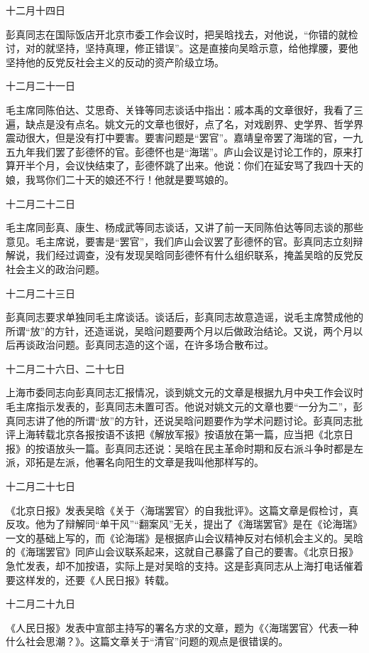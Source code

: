 \begin{maonote}
十二月十四日

彭真同志在国际饭店开北京市委工作会议时，把吴晗找去，对他说，“你错的就检讨，对的就坚持，坚持真理，修正错误”。这是直接向吴晗示意，给他撑腰，要他坚持他的反党反社会主义的反动的资产阶级立场。

十二月二十一日

毛主席同陈伯达、艾思奇、关锋等同志谈话中指出：戚本禹的文章很好，我看了三遍，缺点是没有点名。姚文元的文章也很好，点了名，对戏剧界、史学界、哲学界震动很大，但是没有打中要害。要害问题是“罢官”。嘉靖皇帝罢了海瑞的官，一九五九年我们罢了彭德怀的官。彭德怀也是“海瑞”。庐山会议是讨论工作的，原来打算开半个月，会议快结束了，彭德怀跳了出来。他说：你们在延安骂了我四十天的娘，我骂你们二十天的娘还不行！他就是要骂娘的。

十二月二十二日

毛主席同彭真、康生、杨成武等同志谈话，又讲了前一天同陈伯达等同志谈的那些意见。毛主席说，要害是“罢官”，我们庐山会议罢了彭德怀的官。彭真同志立刻辩解说，我们经过调查，没有发现吴晗同彭德怀有什么组织联系，掩盖吴晗的反党反社会主义的政治问题。

十二月二十三日

彭真同志要求单独同毛主席谈话。谈话后，彭真同志故意造谣，说毛主席赞成他的所谓“放”的方针，还造谣说，吴晗问题要两个月以后做政治结论。又说，两个月以后再谈政治问题。彭真同志造的这个谣，在许多场合散布过。

十二月二十六日、二十七日

上海市委同志向彭真同志汇报情况，谈到姚文元的文章是根据九月中央工作会议时毛主席指示发表的，彭真同志未置可否。他说对姚文元的文章也要“一分为二”，彭真同志讲了他的所谓“放”的方针，还说吴晗问题要作为学术问题讨论。彭真同志批评上海转载北京各报按语不该把《解放军报》按语放在第一篇，应当把《北京日报》的按语放头一篇。彭真同志还说：吴晗在民主革命时期和反右派斗争时都是左派，邓拓是左派，他署名向阳生的文章是我叫他那样写的。

十二月二十七日

《北京日报》发表吴晗《关于〈海瑞罢官〉的自我批评》。这篇文章是假检讨，真反攻。他为了辩解同“单干风”“翻案风”无关，提出了《海瑞罢官》是在《论海瑞》一文的基础上写的，而《论海瑞》是根据庐山会议精神反对右倾机会主义的。吴晗的《海瑞罢官》同庐山会议联系起来，这就自己暴露了自己的要害。《北京日报》急忙发表，却不加按语，实际上是对吴晗的支持。这是彭真同志从上海打电话催着要这样发的，还要《人民日报》转载。

十二月二十九日

《人民日报》发表中宣部主持写的署名方求的文章，题为《〈海瑞罢官〉代表一种什么社会思潮？》。这篇文章关于“清官”问题的观点是很错误的。


\end{maonote}
